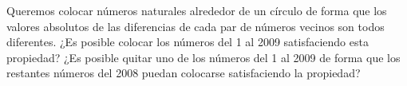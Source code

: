 Queremos colocar números naturales alrededor de un círculo de forma que los valores absolutos de las diferencias de cada par de números vecinos son todos diferentes. ¿Es posible colocar los números del 1 al 2009 satisfaciendo esta propiedad? ¿Es posible quitar uno de los números del 1 al 2009 de forma que los restantes números del 2008 puedan colocarse satisfaciendo la propiedad?

